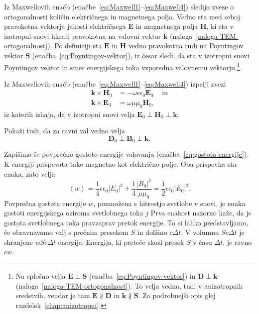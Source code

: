 Iz Maxwellovih enačb (enačbe~\ref{eq:Maxwell1}--\ref{eq:Maxwell4}) sledijo zveze o ortogonalnosti
količin električnega in magnetnega polja. Vedno sta med seboj pravokotna vektorja
jakosti električnega $\mathbf{E}$ in magnetnega polja $\mathbf{H}$, ki sta v izotropni snovi
hkrati pravokotna na valovni vektor $\mathbf{k}$ (naloga~\ref{naloga-TEM-ortogonalnost}).
Po definiciji sta $\mathbf{E}$ in $\mathbf{H}$ vedno pravokotna tudi na Poyntingov vektor $\mathbf{S}$ 
(enačba~\ref{eq:Poyntingov-vektor}), iz česar sledi, da sta v izotropni snovi
Poyntingov vektor in smer energijskega toka vzporedna valovnemu vektorju.\footnote{Na splošno 
velja $\mathbf{E}\perp\mathbf{S}$ (enačba~\ref{eq:Poyntingov-vektor}) in 
$\mathbf{D}\perp\mathbf{k}$ (naloga~\ref{naloga-TEM-ortogonalnost}). 
To velja vedno, tudi v anizotropnih sredstvih, vendar je tam $\mathbf{E} \nparallel 
\mathbf{D}$ in $\mathbf k\nparallel\mathbf S$. Za podrobnejši opis glej 
razdelek~\ref{chap:anizotropni}.} 
\begin{definition}
\label{naloga-TEM-ortogonalnost}
Iz Maxwellovih enačb (enačbe~\ref{eq:Maxwell1}--\ref{eq:Maxwell4}) izpelji zvezi
\begin{align}
\mathbf{k}\times\mathbf{H}_{0} & =-\omega\epsilon\epsilon_{0}\mathbf{E}_{0}\label{eq:TEM-pogoj1}\
\quad \mathrm{in}\\
\mathbf{k}\times\mathbf{E}_{0} & =\omega\mu\mu_{0}\mathbf{H}_{0}\label{eq:TEM-pogoj2},
\end{align}
iz katerih izhaja, da v izotropni snovi velja $\mathbf{E}_0\perp \mathbf{H}_0\perp 
\mathbf{k}$.

Pokaži tudi, da za ravni val vedno velja
\begin{equation}
\mathbf{D}_0 \perp \mathbf{B}_0 \perp \mathbf{k}.  
\end{equation}
\end{definition}

Zapišimo še povprečno gostoto energije valovanja (enačba~\ref{eq:gostota-energije}). 
K energiji prispevata tako magnetno kot električno polje. Oba prispevka sta enaka, zato velja
\begin{equation}
\left\langle w\right\rangle =\frac{1}{4}\epsilon\epsilon_{0}\left|E_{0}\right|^{2}+
\frac{1}{4}\frac{\left|B_{0}\right|^{2}}{\mu\mu_{0}}=\frac{1}{2}\epsilon\epsilon_{0}\left|E_{0}\right|^{2}.
\end{equation}
Povprečna gostota energije $w$, pomnožena s hitrostjo svetlobe v
snovi, je enaka gostoti energijskega oziroma svetlobnega toka $j$
Prva enakost nazorno kaže, da je gostota svetlobnega toka pravzaprav pretok
energije. To si lahko predstavljamo, če obravnavamo valj s prečnim presekom
$S$ in dolžino $c\Delta t$. V volumnu $Sc\Delta t$ je shranjene $wSc\Delta t$
energije. Energija, ki preteče skozi presek $S$ v času $\Delta t$,
je ravno $cw$. 

